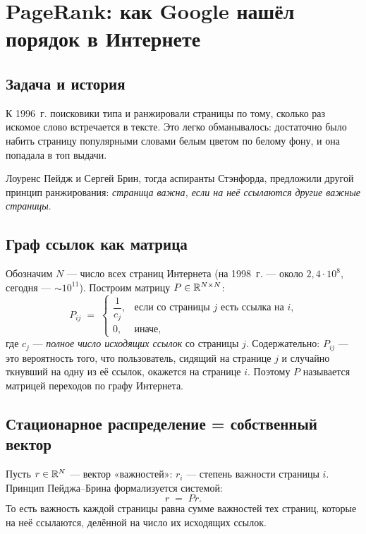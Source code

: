 \section{PageRank: как Google нашёл порядок в Интернете}
\label{sec:linalg-pagerank}

\subsection{Задача и история}

К 1996~г. поисковики типа  и 
ранжировали страницы по тому, сколько раз искомое слово встречается
в тексте. Это легко обманывалось: достаточно было набить страницу
популярными словами белым цветом по белому фону, и она попадала
в топ выдачи.

Лоуренс Пейдж и Сергей Брин, тогда аспиранты Стэнфорда, предложили
другой принцип ранжирования: \emph{страница важна, если на неё
ссылаются другие важные страницы}.

\subsection{Граф ссылок как матрица}

Обозначим $N$ — число всех страниц Интернета (на 1998~г. — около
$2{,}4\cdot 10^{8}$, сегодня — $\sim 10^{11}$). Построим матрицу
$P\in\mathbb{R}^{N\times N}$:
\[
P_{ij}\;=\;\begin{cases}
\dfrac{1}{c_j}, & \text{если со страницы $j$ есть ссылка на $i$,}\\
0, & \text{иначе,}
\end{cases}
\]
где $c_j$ — \emph{полное число исходящих ссылок} со страницы $j$.
Содержательно: $P_{ij}$ — это вероятность того, что пользователь,
сидящий на странице $j$ и случайно ткнувший на одну из её ссылок,
окажется на странице $i$. Поэтому $P$ называется матрицей переходов
 по графу Интернета.

\subsection{Стационарное распределение = собственный вектор}

Пусть $r\in\mathbb{R}^{N}$ — вектор «важностей»: $r_i$ — степень важности
страницы $i$. Принцип Пейджа–Брина формализуется системой:
\begin{equation}\label{eq:pr-fixed}
r\;=\;P r.
\end{equation}
То есть важность каждой страницы равна сумме важностей тех страниц,
которые на неё ссылаются, делённой на число их исходящих ссылок.

